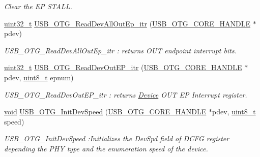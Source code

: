 \begin{DoxyCompactItemize}
\begin{DoxyCompactList}\small\item\em Clear the E\-P S\-T\-A\-L\-L. \end{DoxyCompactList}\item 
\hyperlink{stdint_8h_a435d1572bf3f880d55459d9805097f62}{uint32\-\_\-t} \hyperlink{group___u_s_b___c_o_r_e___exported___functions_prototype_ga33dbdaa5715a5db6d0177ae772af4159}{U\-S\-B\-\_\-\-O\-T\-G\-\_\-\-Read\-Dev\-All\-Out\-Ep\-\_\-itr} (\hyperlink{group___u_s_b___c_o_r_e___exported___types_gaf76054c11eb8a3367907aad7ae700e80}{U\-S\-B\-\_\-\-O\-T\-G\-\_\-\-C\-O\-R\-E\-\_\-\-H\-A\-N\-D\-L\-E} $\ast$pdev)
\begin{DoxyCompactList}\small\item\em U\-S\-B\-\_\-\-O\-T\-G\-\_\-\-Read\-Dev\-All\-Out\-Ep\-\_\-itr \-: returns O\-U\-T endpoint interrupt bits. \end{DoxyCompactList}\item 
\hyperlink{stdint_8h_a435d1572bf3f880d55459d9805097f62}{uint32\-\_\-t} \hyperlink{group___u_s_b___c_o_r_e___exported___functions_prototype_gab431fd0037edf4d5eb1c248dc3bd31d8}{U\-S\-B\-\_\-\-O\-T\-G\-\_\-\-Read\-Dev\-Out\-E\-P\-\_\-itr} (\hyperlink{group___u_s_b___c_o_r_e___exported___types_gaf76054c11eb8a3367907aad7ae700e80}{U\-S\-B\-\_\-\-O\-T\-G\-\_\-\-C\-O\-R\-E\-\_\-\-H\-A\-N\-D\-L\-E} $\ast$pdev, \hyperlink{stdint_8h_aba7bc1797add20fe3efdf37ced1182c5}{uint8\-\_\-t} epnum)
\begin{DoxyCompactList}\small\item\em U\-S\-B\-\_\-\-O\-T\-G\-\_\-\-Read\-Dev\-Out\-E\-P\-\_\-itr \-: returns \hyperlink{struct_device}{Device} O\-U\-T E\-P Interrupt register. \end{DoxyCompactList}\item 
\hyperlink{group___n_a_m_e_ga18028b8badbf1ea7e704ccac3c488e82}{void} \hyperlink{group___u_s_b___c_o_r_e___exported___functions_prototype_ga3eb95924b533c103a88e1f8315486f55}{U\-S\-B\-\_\-\-O\-T\-G\-\_\-\-Init\-Dev\-Speed} (\hyperlink{group___u_s_b___c_o_r_e___exported___types_gaf76054c11eb8a3367907aad7ae700e80}{U\-S\-B\-\_\-\-O\-T\-G\-\_\-\-C\-O\-R\-E\-\_\-\-H\-A\-N\-D\-L\-E} $\ast$pdev, \hyperlink{stdint_8h_aba7bc1797add20fe3efdf37ced1182c5}{uint8\-\_\-t} speed)
\begin{DoxyCompactList}\small\item\em U\-S\-B\-\_\-\-O\-T\-G\-\_\-\-Init\-Dev\-Speed \-:Initializes the Dev\-Spd field of D\-C\-F\-G register depending the P\-H\-Y type and the enumeration speed of the device. \end{DoxyCompactList}\item 

\end{DoxyCompactItemize}
